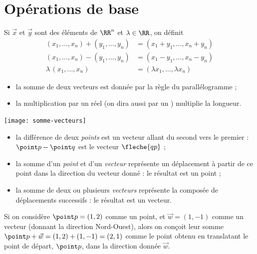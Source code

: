 \section{Opérations de base}
\begin{frame}
  Si \(\vec {x}\) et \(\vec {y}\) sont des éléments de \(\RR^{n}\) et \(\lambda\in \RR\), on définit
  \begin{align*}
    (x_{1}, \ldots, x_{n}) + (y_{1}, \ldots, y_{n}) &= (x_{1}+y_{1}, \ldots, x_{n}+y_{n}) \\
    (x_{1}, \ldots, x_{n}) - (y_{1}, \ldots, y_{n}) &= (x_{1}-y_{1}, \ldots, x_{n}-y_{n}) \\
    \lambda\, (x_{1}, \ldots, x_{n}) &= (\lambda x_{1}, \ldots, \lambda x_{n})
  \end{align*}
\end{frame}

\begin{frame}
  \begin{itemize}
  \item la somme de deux vecteurs est donnée par la règle du parallélogramme ;
  \item la multiplication par un réel (on dira aussi \og par un \fg{}) multiplie la longueur.
  \end{itemize}

  \begin{center}
    \texttt{[image: somme-vecteurs]}
  \end{center}
\end{frame}

\begin{frame}
\begin{itemize}
\item la différence de deux \emph{points} est un vecteur allant du second vers le premier : \(\point p - \point q\) est le vecteur \(\fleche{qp}\) ;
\item la somme d'un \emph{point} et d'un \emph{vecteur} représente un déplacement à partir de ce point dans la direction du vecteur donné : le résultat est un point ;
\item la somme de deux ou plusieurs \emph{vecteurs} représente la composée de déplacements successifs : le résultat est un vecteur.
\end{itemize}

\begin{example}
  Si on considère $\point p = (1,2)$ comme un point, et \(\vec w = (1,-1)\) comme un vecteur (donnant la direction \og Nord-Ouest\fg{}), alors on conçoit leur somme \(\point p + \vec w = (1,2) + (1,-1) = (2,1)\) comme le point obtenu en translatant le point de départ, \(\point p\), dans la direction donnée \(\vec w\).
\end{example}
\end{frame}

